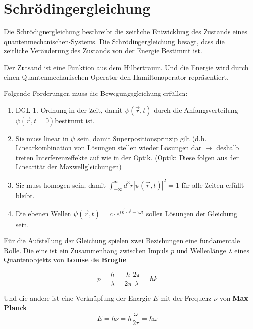 




\section*{Schrödingergleichung}

Die Schrödignergleichung beschreibt die zeitliche Entwicklung des Zustands eines quantenmechanischen-Systems. Die Schrödingergleichung besagt, dass die zeitliche Veränderung des Zustands von der Energie Bestimmt ist.

Der Zutsand ist eine Funktion aus dem Hilbertraum. Und die Energie wird durch einen Quantenmechanischen Operator den Hamiltonoperator repräsentiert.


Folgende Forderungen muss die Bewegungsgleichung erfüllen:
\begin{enumerate}
\item DGL 1. Ordnung in der Zeit, damit $\psi(\vec{r},t)$ durch die Anfangsverteilung
  $\psi(\vec{r},t=0)$bestimmt ist.
\item Sie muss linear in $\psi$ sein, damit Superpositionsprinzip gilt (d.h.
  Linearkombination von Lösungen stellen wieder Lösungen dar $\rightarrow$ deshalb
  treten Interferenzeffekte auf wie in der Optik. (Optik: Diese folgen
  aus der Linearität der Maxwellgleichungen)
\item Sie muss homogen sein, damit
  $\int_{-\infty}^{\infty}d^{3}r|\psi(\vec{r},t)|^{2}=1$ für
  alle Zeiten erfüllt bleibt.
\item Die ebenen Wellen \(\psi(\vec{r},t)=c\cdot  e^{i\vec{k}\cdot\vec{r}-i\omega t}\) sollen  Lösungen der Gleichung sein. 
\end{enumerate}

Für die Aufstellung der Gleichung spielen zwei Beziehungen eine fundamentale Rolle. Die eine ist ein Zusammenhang zwischen Impuls \(p\) und Wellenlänge \(\lambda\) eines Quantenobjekts von \textbf{Louise de Broglie}

\begin{equation}
  \label{eq:3}
  p = \frac{h}{\lambda} = \frac{h}{2\pi}\frac{2\pi}{\lambda} = \hbar k
\end{equation}

Und die andere ist eine Verknüpfung der Energie \(E\) mit der Frequenz \(\nu\) von \textbf{Max Planck}
\begin{equation}
  \label{eq:2}
  E=h\nu=h\frac{\omega}{2\pi} =\hbar \omega
\end{equation}

